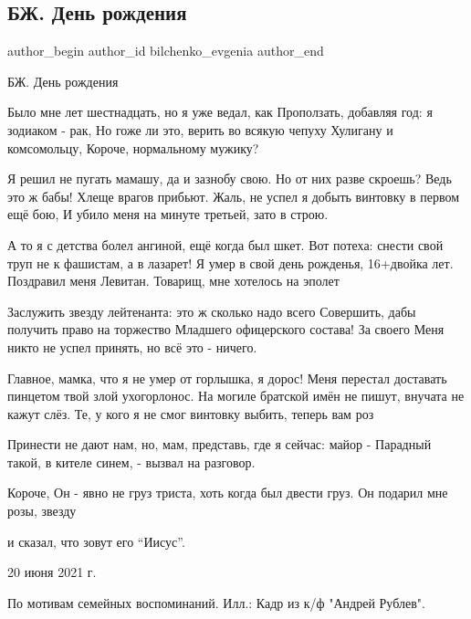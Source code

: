  
 
 
 
 
 
\subsection{БЖ. День рождения}
\label{sec:20_06_2021.tg.bilchenko_evgenia.1.den_rozhdenija}
\ifcmt
 author_begin
   author_id bilchenko_evgenia
 author_end
\fi

БЖ. День рождения 

Было мне лет шестнадцать, но я уже ведал, как
Проползать, добавляя год: я зодиаком - рак,
Но гоже ли это, верить во всякую чепуху
Хулигану и комсомольцу, 
Короче, нормальному мужику?

Я решил не пугать мамашу, да и зазнобу свою.
Но от них разве скроешь? Ведь это ж бабы! Хлеще врагов прибьют.
Жаль, не успел я добыть винтовку в первом ещё бою,
И убило меня на минуте третьей, зато в строю.

А то я с детства болел ангиной, ещё когда был шкет.
Вот потеха: снести свой труп не к фашистам, а в лазарет!
Я умер в свой день рожденья, 16+двойка лет.
Поздравил меня Левитан. Товарищ, мне хотелось на эполет

Заслужить звезду лейтенанта: это ж сколько надо  всего
Совершить, дабы получить право на торжество
Младшего офицерского состава! За своего
Меня никто не успел принять, но всё это - ничего.

Главное, мамка, что я не умер от горлышка, я дорос!
Меня перестал доставать пинцетом твой злой ухогорлонос.
На могиле братской имён не пишут, внучата не кажут слёз.
Те, у кого я не смог винтовку выбить, теперь вам роз

Принести не дают нам, но, мам, представь, где я сейчас: майор -
Парадный такой, в кителе синем, - вызвал на разговор.

Короче, Он - явно не груз триста, хоть когда был двести груз.
Он подарил мне розы, звезду 

и сказал, что зовут его \enquote{Иисус}. 

20 июня 2021 г.

По мотивам семейных воспоминаний.
Илл.: Кадр из к/ф "Андрей Рублев".
